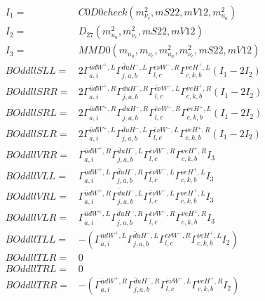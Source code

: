 \documentclass[A4,landscape]{article}
\begin{document}
\begin{align} 
I_1 = & C0D0check(m^2_{\nu_{{c}}}, mS22, mV12, m^2_{u_{{a}}}) \\ 
I_2 = & D_{27}(m^2_{u_{{a}}}, m^2_{\nu_{{c}}}, mS22, mV12) \\ 
I_3 = & MMD0(m_{u_{{a}}}, m_{\nu_{{c}}}, m^2_{u_{{a}}}, m^2_{\nu_{{c}}}, mS22, mV12) \\ 
  BOddllSLL= & 2  \Gamma^{\bar{u}d W^+,L}_{a, i} \Gamma^{\bar{d}u H^- ,L}_{j, a, b} \Gamma^{\bar{e}\nu W^- ,R}_{l, c} \Gamma^{\nu e H^+,L}_{c, k, b} (I_1 - 2 I_2) \\ 
  BOddllSRR= & 2  \Gamma^{\bar{u}d W^+,R}_{a, i} \Gamma^{\bar{d}u H^- ,R}_{j, a, b} \Gamma^{\bar{e}\nu W^- ,L}_{l, c} \Gamma^{\nu e H^+,R}_{c, k, b} (I_1 - 2 I_2) \\ 
  BOddllSRL= & 2  \Gamma^{\bar{u}d W^+,R}_{a, i} \Gamma^{\bar{d}u H^- ,R}_{j, a, b} \Gamma^{\bar{e}\nu W^- ,R}_{l, c} \Gamma^{\nu e H^+,L}_{c, k, b} (I_1 - 2 I_2) \\ 
  BOddllSLR= & 2  \Gamma^{\bar{u}d W^+,L}_{a, i} \Gamma^{\bar{d}u H^- ,L}_{j, a, b} \Gamma^{\bar{e}\nu W^- ,L}_{l, c} \Gamma^{\nu e H^+,R}_{c, k, b} (I_1 - 2 I_2) \\ 
  BOddllVRR= &  \Gamma^{\bar{u}d W^+,R}_{a, i} \Gamma^{\bar{d}u H^- ,L}_{j, a, b} \Gamma^{\bar{e}\nu W^- ,R}_{l, c} \Gamma^{\nu e H^+,R}_{c, k, b} I_3 \\ 
  BOddllVLL= &  \Gamma^{\bar{u}d W^+,L}_{a, i} \Gamma^{\bar{d}u H^- ,R}_{j, a, b} \Gamma^{\bar{e}\nu W^- ,L}_{l, c} \Gamma^{\nu e H^+,L}_{c, k, b} I_3 \\ 
  BOddllVRL= &  \Gamma^{\bar{u}d W^+,R}_{a, i} \Gamma^{\bar{d}u H^- ,L}_{j, a, b} \Gamma^{\bar{e}\nu W^- ,L}_{l, c} \Gamma^{\nu e H^+,L}_{c, k, b} I_3 \\ 
  BOddllVLR= &  \Gamma^{\bar{u}d W^+,L}_{a, i} \Gamma^{\bar{d}u H^- ,R}_{j, a, b} \Gamma^{\bar{e}\nu W^- ,R}_{l, c} \Gamma^{\nu e H^+,R}_{c, k, b} I_3 \\ 
  BOddllTLL= & -( \Gamma^{\bar{u}d W^+,L}_{a, i} \Gamma^{\bar{d}u H^- ,L}_{j, a, b} \Gamma^{\bar{e}\nu W^- ,R}_{l, c} \Gamma^{\nu e H^+,L}_{c, k, b} I_2) \\ 
  BOddllTLR= & 0 \\ 
  BOddllTRL= & 0 \\ 
  BOddllTRR= & -( \Gamma^{\bar{u}d W^+,R}_{a, i} \Gamma^{\bar{d}u H^- ,R}_{j, a, b} \Gamma^{\bar{e}\nu W^- ,L}_{l, c} \Gamma^{\nu e H^+,R}_{c, k, b} I_2) \\ 
\end{align} 
\end{document}
